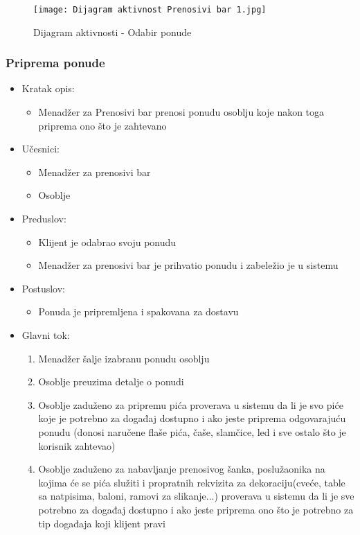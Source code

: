 \documentclass[a4paper]{article}
\begin{document}
\begin{figure}[H]
    \centering
    \texttt{[image: Dijagram aktivnost Prenosivi bar 1.jpg]}
    \caption{Dijagram aktivnosti - Odabir ponude}
    \label{fig:PrenosiviBar}
\end{figure}


\subsubsection{Priprema ponude}

\begin{itemize}
    \item Kratak opis:
        \begin{itemize}
            \item Menadžer za Prenosivi bar prenosi ponudu osoblju koje nakon toga priprema ono što je zahtevano
        \end{itemize}
    \item Učesnici:
        \begin{itemize}
            \item Menadžer za prenosivi bar
            \item Osoblje
        \end{itemize}
    \item Preduslov:
        \begin{itemize}
            \item Klijent je odabrao svoju ponudu
		    \item Menadžer za prenosivi bar je prihvatio ponudu i zabeležio je u sistemu
        \end{itemize}
    \item Postuslov:
        \begin{itemize}
            \item Ponuda je pripremljena i spakovana za dostavu
        \end{itemize}
    \item Glavni tok:
        \begin{enumerate}
           \item Menadžer šalje izabranu ponudu osoblju
		   \item Osoblje preuzima detalje o ponudi
	       \item Osoblje zaduženo za pripremu pića proverava u sistemu da li je svo piće koje je potrebno za događaj dostupno i ako jeste priprema odgovarajuću ponudu (donosi naručene flaše pića, čaše, slamčice, led i sve ostalo što je korisnik zahtevao)
	       \item Osoblje  zaduženo za nabavljanje prenosivog šanka, poslužaonika na kojima će se pića služiti i propratnih rekvizita za dekoraciju(cveće, table sa natpisima, baloni, ramovi za slikanje...) proverava u sistemu da li je sve potrebno za događaj dostupno i ako jeste priprema ono što je potrebno za tip događaja koji klijent pravi

\end{enumerate}
\end{itemize}
\end{document}
